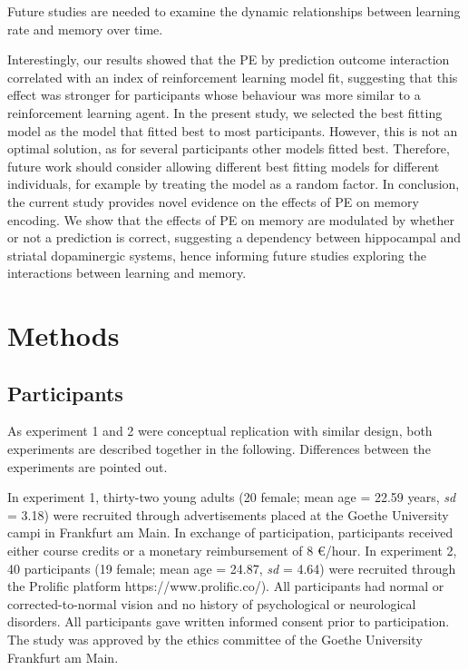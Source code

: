 \documentclass[a4paper,12pt]{article}
\begin{document}
Future studies are needed to examine the dynamic relationships between learning rate and memory over time.  
\par
Interestingly, our results showed that the PE by prediction outcome interaction correlated with an index of reinforcement learning model fit, suggesting that this effect was stronger for participants whose behaviour was more similar to a reinforcement learning agent. In the present study, we selected the best fitting model as the model that fitted best to most participants. However, this is not an optimal solution, as for several participants other models fitted best. Therefore, future work should consider allowing different best fitting models for different individuals, for example by treating the model as a random factor.  
In conclusion, the current study provides novel evidence on the effects of PE on memory encoding. We show that the effects of PE on memory are modulated by whether or not a prediction is correct, suggesting a dependency between hippocampal and striatal dopaminergic systems, hence informing future studies exploring the interactions between learning and memory. 


\section{Methods}
\subsection{Participants}
As experiment 1 and 2 were conceptual replication with similar design, both experiments are described together in the following. Differences between the experiments are pointed out. \par
In experiment 1, thirty-two young adults (20 female; mean age = 22.59 years, \textit{sd} = 3.18) were recruited through advertisements placed at the Goethe University campi in Frankfurt am Main. In exchange of participation, participants received either course credits or a monetary reimbursement of 8 €/hour. 
In experiment 2, 40 participants (19 female; mean age = 24.87, \textit{sd} = 4.64) were recruited through the Prolific platform https://www.prolific.co/). All participants had normal or corrected-to-normal vision and no history of psychological or neurological disorders. All participants gave written informed consent prior to participation. The study was approved by the ethics committee of the Goethe University Frankfurt am Main. 
\end{document}
